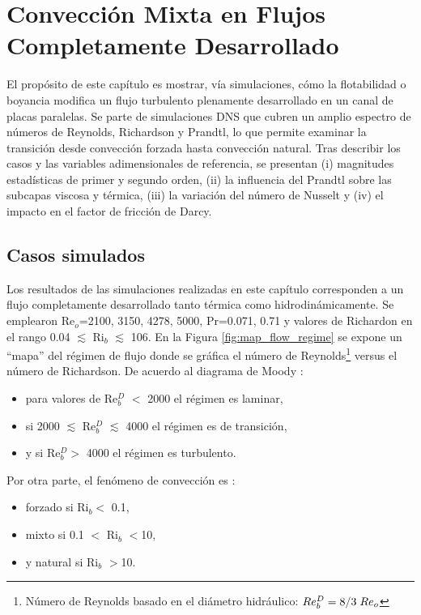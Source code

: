 \chapter{Convección Mixta en Flujos Completamente Desarrollado}


El propósito de este capítulo es mostrar, vía simulaciones, cómo la flotabilidad o boyancia modifica un flujo turbulento plenamente desarrollado en un canal de placas paralelas. Se parte de simulaciones DNS que cubren un amplio espectro de números de Reynolds, Richardson y Prandtl, lo que permite examinar la transición desde convección forzada hasta convección natural. Tras describir los casos y las variables adimensionales de referencia, se presentan (i) magnitudes estadísticas de primer y segundo orden, (ii) la influencia del Prandtl sobre las subcapas viscosa y térmica, (iii) la variación del número de Nusselt y (iv) el impacto en el factor de fricción de Darcy.

\newpage

\section{Casos simulados} 

Los resultados de las simulaciones realizadas en este capítulo corresponden a un flujo completamente desarrollado tanto térmica como hidrodinámicamente. Se emplearon Re$_o$=2100, 3150, 4278, 5000, Pr=0.071, 0.71 y valores de Richardon en el rango 0.04 $\lesssim$ Ri$_b$ $\lesssim$ 106. En la Figura \ref{fig:map_flow_regime} se expone un ``mapa'' del régimen de flujo donde se gráfica el número de Reynolds\footnote{Número de Reynolds basado en el diámetro hidráulico: $Re^D_b = 8/3 \hspace*{1mm} Re_o$} versus el número de Richardson. De acuerdo al diagrama de Moody \cite{white}:

\begin{itemize}
	\item para valores de Re$^D_b$ $<$ 2000 el régimen es laminar,
	\item si 2000 $\lesssim$ Re$^D_b$ $\lesssim$ 4000 el régimen es de transición,
	\item y si Re$^D_b>$ 4000 el régimen es turbulento.
\end{itemize}
Por otra parte, el fenómeno de convección es \cite{incropera,cengelheat}:

\begin{itemize}
	\item forzado si Ri$_b<$ 0.1,
	\item mixto si 0.1 $<$ Ri$_b$ $<$10,
	\item y natural si Ri$_b$ $>$10.
\end{itemize}

